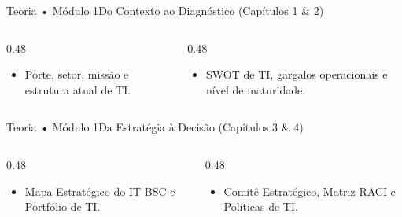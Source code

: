 \begin{senaiframe}{Teoria • Módulo 1}{Do Contexto ao Diagnóstico (Capítulos 1 \& 2)}
  \begin{columns}[t]
    \begin{column}{0.48\textwidth}
      \begin{tcolorbox}[senaicard, title={Capítulo 1: Onde Estamos}]
        \begin{itemize}
          \item Porte, setor, missão e estrutura atual de TI.
        \end{itemize}
      \end{tcolorbox}
    \end{column}
    \begin{column}{0.48\textwidth}
      \begin{tcolorbox}[senairedcard, title={Capítulo 2: O que nos Dói}]
        \begin{itemize}
          \item SWOT de TI, gargalos operacionais e nível de maturidade.
        \end{itemize}
      \end{tcolorbox}
    \end{column}
  \end{columns}
\end{senaiframe}

\begin{senaiframe}{Teoria • Módulo 1}{Da Estratégia à Decisão (Capítulos 3 \& 4)}
  \begin{columns}[t]
    \begin{column}{0.48\textwidth}
      \begin{tcolorbox}[senaibluecard, title={Capítulo 3: Aonde Queremos Ir}]
        \begin{itemize}
          \item Mapa Estratégico do IT BSC e Portfólio de TI.
        \end{itemize}
      \end{tcolorbox}
    \end{column}
    \begin{column}{0.48\textwidth}
      \begin{tcolorbox}[senaiambercard, title={Capítulo 4: Quem Decide}]
        \begin{itemize}
          \item Comitê Estratégico, Matriz RACI e Políticas de TI.
        \end{itemize}
      \end{tcolorbox}
    \end{column}
  \end{columns}
\end{senaiframe}

